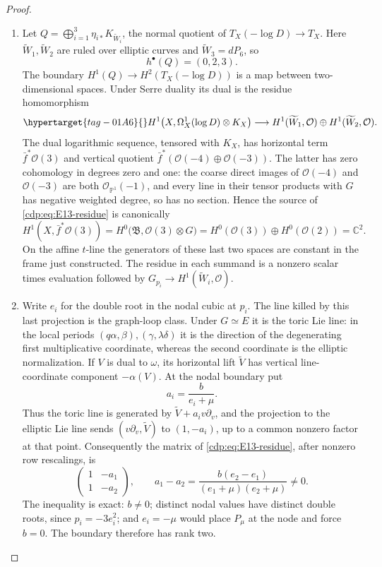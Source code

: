 \begin{proof}
\begin{enumerate}[label=\arabic*.,leftmargin=*]
\item Let $Q=\bigoplus_{i=1}^3\eta_{i*}K_{\widetilde W_i}$, the normal
quotient of $T_X(-\log D)\to T_X$. Here
$\widetilde W_1,\widetilde W_2$ are ruled over elliptic curves and
$\widetilde W_3=dP_6$, so
\[
 h^\bullet(Q)=(0,2,3).
\]
The boundary $H^1(Q)\to H^2(T_X(-\log D))$ is a map between
two-dimensional spaces.
Under Serre duality its dual is the residue homomorphism
\begin{equation}\hypertarget{tag-01A6}{}\label{cdp:eq:E13-residue}
 H^1\bigl(X,\Omega_X^1(\log D)\otimes K_X\bigr)
 \longrightarrow
 H^1(\widetilde W_1,\mathcal O)\oplus
 H^1(\widetilde W_2,\mathcal O).
\end{equation}
The dual logarithmic sequence, tensored with $K_X$, has horizontal
term $\bar f^*\mathcal O(3)$ and vertical quotient
$\bar f^*(\mathcal O(-4)\oplus\mathcal O(-3))$.
The latter has zero cohomology in degrees zero and one: the coarse
direct images of $\mathcal O(-4)$ and $\mathcal O(-3)$ are both
$\mathcal O_{\mathbb P^1}(-1)$, and every line in their tensor
products with $G$ has negative weighted degree, so has no section.
Hence the
source of \eqref{cdp:eq:E13-residue} is canonically
\[
 H^1(X,\bar f^*\mathcal O(3))
 =H^0\bigl(\mathfrak B,\mathcal O(3)\otimes G\bigr)
 =H^0(\mathcal O(3))\oplus H^0(\mathcal O(2))=\mathbb C^2.
\]
On the affine $t$-line the generators of these last two spaces are
constant in the frame just constructed. The residue in each
summand is a nonzero scalar times evaluation followed by
$G_{p_i}\to H^1(\widetilde W_i,\mathcal O)$.

\item Write $e_i$ for the double root in the nodal cubic at $p_i$.
The line killed by this last projection is the graph-loop class.
Under $G\simeq E$ it is the toric Lie line: in the local periods
$(q\alpha,\beta),(\gamma,\lambda\delta)$ it is the direction
of the degenerating first multiplicative coordinate, whereas the
second coordinate is the elliptic normalization. If $V$ is dual to
$\omega$, its horizontal lift $\widetilde V$ has vertical
line-coordinate component $-\alpha(V)$. At the nodal boundary put
\[
 a_i=\frac{b}{e_i+\mu}.
\]
Thus the toric line is generated by
$\widetilde V+a_i v\partial_v$, and the projection to the elliptic
Lie line sends $(v\partial_v,\widetilde V)$ to $(1,-a_i)$, up to
a common nonzero factor at that point. Consequently the matrix of
\eqref{cdp:eq:E13-residue}, after nonzero row rescalings, is
\[
 \begin{pmatrix}1&-a_1\\1&-a_2\end{pmatrix},\qquad
 a_1-a_2=\frac{b(e_2-e_1)}{(e_1+\mu)(e_2+\mu)}\ne0.
\]
The inequality is exact: $b\ne0$; distinct nodal values have
distinct double roots, since $p_i=-3e_i^2$; and $e_i=-\mu$ would
place $P_\mu$ at the node and force $b=0$. The boundary therefore
has rank two.


\end{enumerate}
\end{proof}
